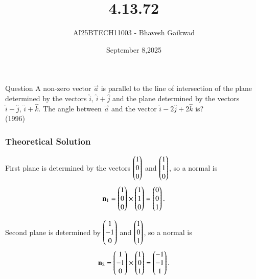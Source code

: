 \documentclass{beamer}
\title
{4.13.72}
\date{September 8,2025}
\author 
{AI25BTECH11003 - Bhavesh Gaikwad}
\begin{document}
\frame{\titlepage}
\begin{frame}{Question}
A non-zero vector $\vec{a}$ is parallel to the line of intersection of the plane determined by the vectors $\hat{i}, \, \hat{i} + \hat{j}$ and the plane determined by the vectors $\hat{i} - \hat{j}, \, \hat{i} + \hat{k}$. The angle between $\vec{a}$ and the vector $\hat{i} - 2\hat{j} + 2\hat{k}$ is?\\
\hfill{(1996)}
\end{frame}


\begin{frame}[fragile]
    \frametitle{Theoretical Solution}
First plane is determined by the vectors $\begin{pmatrix}1 \\ 0 \\ 0\end{pmatrix}$ and $\begin{pmatrix}1 \\ 1 \\ 0\end{pmatrix}$, so a normal is
\begin{equation}
\mathbf{n}_1
= 
\begin{pmatrix}1 \\ 0 \\ 0\end{pmatrix} \times \begin{pmatrix}1 \\ 1 \\ 0\end{pmatrix}
=
\begin{pmatrix}0 \\ 0 \\ 1\end{pmatrix}.
\end{equation}


 Second plane is determined by $\begin{pmatrix}1 \\ -1 \\ 0\end{pmatrix}$ and $\begin{pmatrix}1 \\ 0 \\ 1\end{pmatrix}$, so a normal is
\begin{equation}
\mathbf{n}_2
=
\begin{pmatrix}1 \\ -1 \\ 0\end{pmatrix} \times \begin{pmatrix}1 \\ 0 \\ 1\end{pmatrix}
=
\begin{pmatrix}-1 \\ -1 \\ 1\end{pmatrix}.
\end{equation}
\end{frame}
\end{document}
